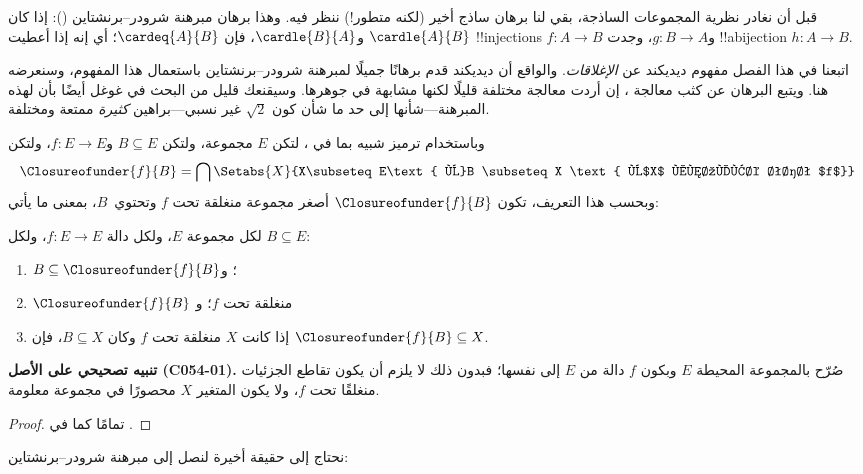 \documentclass[../../../include/open-logic-section]{subfiles}
\begin{document}


قبل أن نغادر نظرية المجموعات الساذجة، بقي لنا برهان ساذج أخير (لكنه
متطور!) ننظر فيه. وهذا برهان مبرهنة شرودر–برنشتاين
(): إذا كان
$\cardle{A}{B}$ و$\cardle{B}{A}$، فإن $\cardeq{A}{B}$؛ أي إنه إذا
أعطيت !!{injection}s $f \colon A \to B$ و$g \colon B \to A$، وجدت
!!a{bijection} $h \colon A \to B$.

اتبعنا في هذا الفصل مفهوم ديديكند عن \emph{الإغلاقات}. والواقع أن
ديديكند قدم برهانًا جميلًا لمبرهنة شرودر–برنشتاين باستعمال هذا
المفهوم، وسنعرضه هنا. ويتبع البرهان عن كثب معالجة
\citet[صص.~157--8]{Potter2004}، إن أردت معالجة مختلفة قليلًا لكنها
مشابهة في جوهرها. وسيقنعك قليل من البحث في غوغل أيضًا بأن لهذه
المبرهنة---شأنها إلى حد ما شأن كون $\sqrt{2}$ غير نسبي---براهين
\emph{كثيرة} ممتعة ومختلفة.

وباستخدام ترميز شبيه بما في
، لتكن $E$ مجموعة، ولتكن
$B\subseteq E$ و$f\colon E\to E$، ولتكن
\[
\Closureofunder{f}{B} = \bigcap \Setabs{X}{X\subseteq E\text{ و}B \subseteq X
\text{ و$X$ منغلقة تحت $f$}}
\]
وبحسب هذا التعريف، تكون
$\Closureofunder{f}{B}$ أصغر مجموعة منغلقة تحت $f$ وتحتوي~$B$، بمعنى
ما يأتي:

\begin{lem}
	لكل مجموعة $E$، ولكل دالة $f\colon E\to E$، ولكل $B\subseteq E$:
	\begin{enumerate}
		\item{} $B \subseteq \Closureofunder{f}{B}$؛ و
		\item{} $\Closureofunder{f}{B}$ منغلقة تحت $f$؛ و
		\item{} إذا كانت $X$ منغلقة تحت $f$ وكان $B
		\subseteq X$، فإن $\Closureofunder{f}{B} \subseteq X$.
	\end{enumerate}
\end{lem}

\textbf{تنبيه تصحيحي على الأصل (C054-01).} صُرّح بالمجموعة المحيطة $E$ وبكون
$f$ دالة من $E$ إلى نفسها؛ فبدون ذلك لا يلزم أن يكون تقاطع الجزئيات
منغلقًا تحت $f$، ولا يكون المتغير $X$ محصورًا في مجموعة معلومة.

\begin{proof}
تمامًا كما في .
\end{proof}

نحتاج إلى حقيقة أخيرة لنصل إلى مبرهنة شرودر–برنشتاين:
\end{document}

